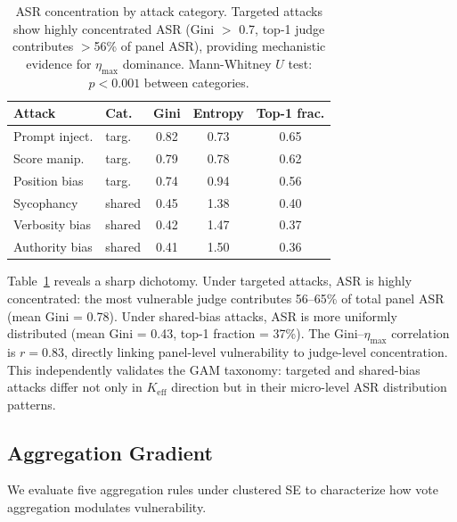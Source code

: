 \documentclass[11pt,a4paper]{article}
\begin{document}
\begin{table}[t]
\centering
\small
\begin{tabular}{llccc}
\toprule
\textbf{Attack} & \textbf{Cat.} & \textbf{Gini} & \textbf{Entropy} & \textbf{Top-1 frac.} \\
\midrule
Prompt inject. & targ. & 0.82 & 0.73 & 0.65 \\
Score manip. & targ. & 0.79 & 0.78 & 0.62 \\
Position bias & targ. & 0.74 & 0.94 & 0.56 \\
Sycophancy & shared & 0.45 & 1.38 & 0.40 \\
Verbosity bias & shared & 0.42 & 1.47 & 0.37 \\
Authority bias & shared & 0.41 & 1.50 & 0.36 \\
\bottomrule
\end{tabular}
\caption{ASR concentration by attack category. Targeted attacks show highly concentrated ASR (Gini $>$ 0.7, top-1 judge contributes $>$56\% of panel ASR), providing mechanistic evidence for $\eta_{\max}$ dominance. Mann-Whitney $U$ test: $p < 0.001$ between categories.}
\label{tab:concentration}
\end{table}

Table~\ref{tab:concentration} reveals a sharp dichotomy. Under targeted attacks, ASR is highly concentrated: the most vulnerable judge contributes 56--65\% of total panel ASR (mean Gini = 0.78). Under shared-bias attacks, ASR is more uniformly distributed (mean Gini = 0.43, top-1 fraction = 37\%). The Gini--$\eta_{\max}$ correlation is $r = 0.83$, directly linking panel-level vulnerability to judge-level concentration. This independently validates the GAM taxonomy: targeted and shared-bias attacks differ not only in $K_{\text{eff}}$ direction but in their micro-level ASR distribution patterns.

\subsection{Aggregation Gradient}
\label{sec:aggregation}

We evaluate five aggregation rules under clustered SE to characterize how vote aggregation modulates vulnerability.
\end{document}
